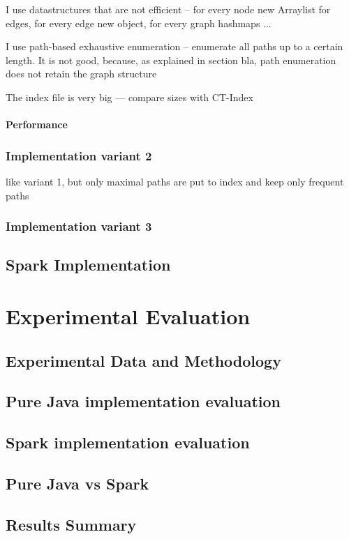 \documentclass{l4proj}
\theoremstyle{definition}
\begin{document}
            I use datastructures that are not efficient -- for every node new Arraylist for edges, for every edge new object, for every graph hashmaps ...
            
            I use path-based exhaustive enumeration -- enumerate all paths up to a certain length. It is not good, because, as explained in section bla, path enumeration does not retain the graph structure
            
            The index file is very big --- compare sizes with CT-Index
            \subsubsection{Performance}
        \subsection{Implementation variant 2}
        
        like variant 1, but only maximal paths are put to index and 
        keep only frequent paths
        \subsection{Implementation variant 3}
    \section{Spark Implementation}

\chapter{Experimental Evaluation}
    \section{Experimental Data and Methodology}
    \section{Pure Java implementation evaluation}
    \section{Spark implementation evaluation}
    \section{Pure Java vs Spark}
    \section{Results Summary}
    
\end{document}

